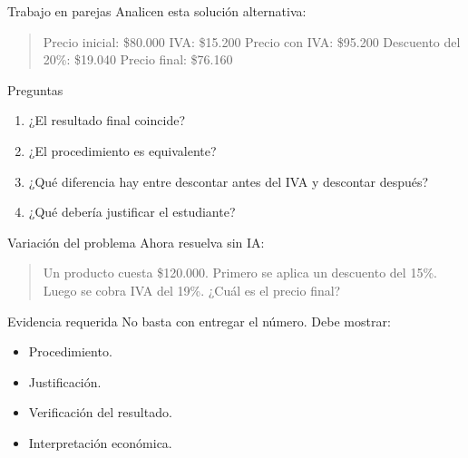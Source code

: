 \documentclass[
  ignorenonframetext,
  aspectratio=169,
  spanish,
]{beamer}
\providecommand{\tightlist}{%
  \setlength{\itemsep}{0pt}\setlength{\parskip}{0pt}}
\begin{document}
\begin{frame}{Trabajo en parejas}
\protect{}\label{trabajo-en-parejas}
Analicen esta solución alternativa:

\begin{quote}
Precio inicial: \$80.000 IVA: \$15.200 Precio con IVA: \$95.200
Descuento del 20\%: \$19.040 Precio final: \$76.160
\end{quote}

\begin{block}{Preguntas}
\protect{}\label{preguntas}
\begin{enumerate}
\tightlist
\item
  ¿El resultado final coincide?
\item
  ¿El procedimiento es equivalente?
\item
  ¿Qué diferencia hay entre descontar antes del IVA y descontar después?
\item
  ¿Qué debería justificar el estudiante?
\end{enumerate}
\end{block}
\end{frame}

\begin{frame}{Variación del problema}
\protect{}\label{variaciuxf3n-del-problema}
Ahora resuelva sin IA:

\begin{quote}
Un producto cuesta \$120.000. Primero se aplica un descuento del 15\%.
Luego se cobra IVA del 19\%. ¿Cuál es el precio final?
\end{quote}

\begin{block}{Evidencia requerida}
\protect{}\label{evidencia-requerida}
No basta con entregar el número. Debe mostrar:

\begin{itemize}
\tightlist
\item
  Procedimiento.
\item
  Justificación.
\item
  Verificación del resultado.
\item
  Interpretación económica.
\end{itemize}
\end{block}
\end{frame}
\end{document}
